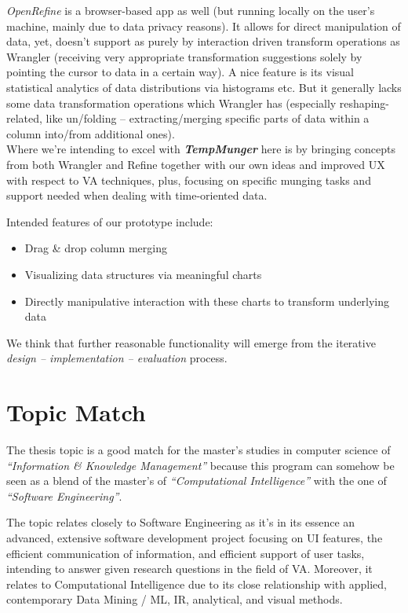 \textit{OpenRefine} is a browser-based app as well (but running locally on the user's machine, mainly due to data privacy reasons). It allows for direct manipulation of data, yet, doesn't support as purely by interaction driven transform operations as Wrangler (receiving very appropriate transformation suggestions solely by pointing the cursor to data in a certain way). A nice feature is its visual statistical analytics of data distributions via histograms etc. But it generally lacks some data transformation operations which Wrangler has (especially reshaping-related, like un/folding -- extracting/merging specific parts of data within a column into/from additional ones).
\\

Where we're intending to excel with \textbf{\textit{TempMunger}} here is by bringing concepts from both Wrangler and Refine together with our own ideas and improved UX with respect to VA techniques, plus, focusing on specific munging tasks and support needed when dealing with time-oriented data.

Intended features of our prototype include:

\begin{itemize}
  \item Drag \& drop column merging
  \item Visualizing data structures via meaningful charts
  \item Directly manipulative interaction with these charts to transform underlying data
\end{itemize}

We think that further reasonable functionality will emerge from the iterative \textit{design -- implementation -- evaluation} process.


\section{Topic Match}

The thesis topic is a good match for the master's studies in computer science of \textit{``Information \& Knowledge Management''} because this program can somehow be seen as a blend of the master's of \textit{``Computational Intelligence''} with the one of \textit{``Software Engineering''}.

The topic relates closely to Software Engineering as it's in its essence an advanced, extensive software development project focusing on UI features, the efficient communication of information, and efficient support of user tasks, intending to answer given research questions in the field of VA.
Moreover, it relates to Computational Intelligence due to its close relationship with applied, contemporary Data Mining / ML, IR, analytical, and visual methods.
